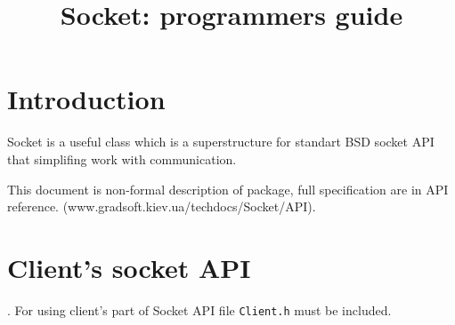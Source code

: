 \documentclass[10pt]{article}
\title{ Socket: programmers guide  }
\begin{document}
\maketitle{}

\tableofcontents

\section{ Introduction }
  Socket is a useful class which is a superstructure for standart BSD socket
  API that simplifing work with communication.

  This document is non-formal description of package, full specification are in
  API reference. (www.gradsoft.kiev.ua/techdocs/Socket/API).
\newpage
\section{ Client's socket API }.
 { For using client's part of Socket API file \verb|Client.h|
   must be included. }
\end{document}
